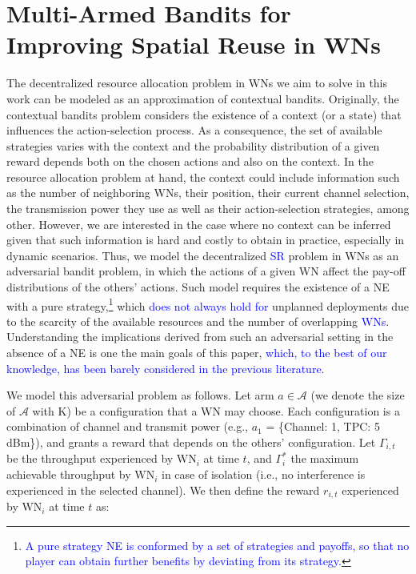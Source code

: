 \documentclass[10pt,journal,compsoc]{IEEEtran}
\newcommand{\francesc}[1]{\textcolor{blue}{#1}}
\begin{document}
	\section{Multi-Armed Bandits for Improving Spatial Reuse in WNs}
	\label{section:mabs}	
	The decentralized resource allocation problem in WNs we aim to solve in this work can be modeled as an approximation of contextual bandits. Originally, the contextual bandits problem considers the existence of a context (or a state) that influences the action-selection process. As a consequence, the set of available strategies varies with the context and the probability distribution of a given reward depends both on the chosen actions and also on the context. In the resource allocation problem at hand, the context could include information such as the number of neighboring WNs, their position, their current channel selection, the transmission power they use as well as their action-selection strategies, among other. However, we are interested in the case where no context can be inferred given that such information is hard and costly to obtain in practice, especially in dynamic scenarios. Thus, we model the decentralized \francesc{SR} problem in WNs as an adversarial bandit problem, in which the actions of a given WN affect the pay-off distributions of the others' actions. Such model requires the existence of a NE with a pure strategy,\footnote{\francesc{A pure strategy NE is conformed by a set of strategies and payoffs, so that no player can obtain further benefits by deviating from its strategy.}} which \francesc{does not always hold for} unplanned deployments due to the scarcity of the available resources and the number of overlapping \francesc{WNs}. Understanding the implications derived from such an adversarial setting in the absence of a NE is one the main goals of this paper, \francesc{which, to the best of our knowledge, has been barely considered in the previous literature}.
	
	We model this adversarial problem as follows. Let arm $a \in \mathcal{A}$ (we denote the size of $\mathcal{A}$ with K) be a configuration that a WN may choose. Each configuration is a combination of channel and transmit power (e.g., $a_1$ = \{Channel: 1, TPC: 5 dBm\}), and grants a reward that depends on the others' configuration. Let $\Gamma_{i,t}$ be the throughput experienced by $\text{WN}_i$ at time $t$, and $\Gamma_{i}^*$ the maximum achievable throughput by $\text{WN}_i$ in case of isolation (i.e., no interference is experienced in the selected channel). We then define the reward $r_{i,t}$ experienced by $\text{WN}_i$ at time $t$ as:
	
\end{document}
